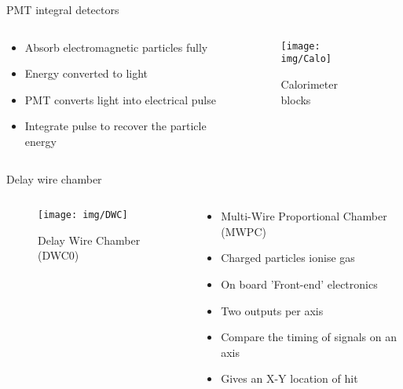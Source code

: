 \documentclass[9pt]{beamer}
\begin{document}
\begin{frame}{PMT integral detectors}
  \begin{columns}
    \begin{column}{.4\textwidth}
      \begin{itemize}
        \item Absorb electromagnetic particles fully
        \item Energy converted to light
        \item PMT converts light into electrical pulse
        \item Integrate pulse to recover the particle energy
      \end{itemize}
    \end{column}
    \begin{column}{.6\textwidth}
    \vspace*{-0.5cm}
    \begin{figure}\texttt{[image: img/Calo]}\vspace*{-0.2cm}\caption{Calorimeter blocks}\end{figure}\vspace*{-1cm}
    \end{column}
  \end{columns}
\end{frame}

\begin{frame}{Delay wire chamber}
  \begin{columns}
    \begin{column}{.6\textwidth}
    \vspace*{-0.5cm}
    \begin{figure}\texttt{[image: img/DWC]}\vspace*{-0.2cm}\caption{Delay Wire Chamber (DWC0)}\end{figure}\vspace*{-1cm}
    \end{column}
    \begin{column}{.4\textwidth}
      \begin{itemize}
        \item Multi-Wire Proportional Chamber (MWPC)
        \item Charged particles ionise gas
        \item On board 'Front-end' electronics
        \item Two outputs per axis
        \item Compare the timing of signals on an axis
        \item Gives an X-Y location of hit
      \end{itemize}
    \end{column}
  \end{columns}
\end{frame}
\end{document}
